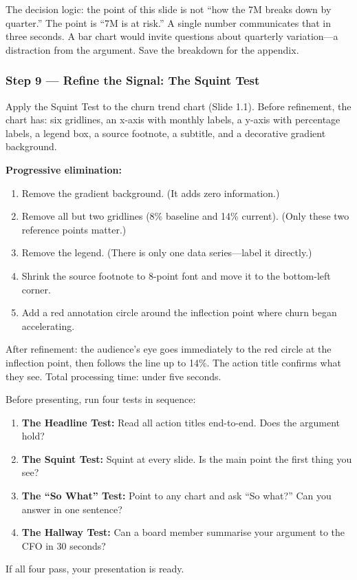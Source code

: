 \noindent The decision logic: the point of this slide is not ``how the \texteuro{}7M breaks down by quarter.'' The point is ``\texteuro{}7M is at risk.'' A single number communicates that in three seconds. A bar chart would invite questions about quarterly variation---a distraction from the argument. Save the breakdown for the appendix.

\subsubsection*{Step 9 --- Refine the Signal: The Squint Test}

Apply the Squint Test to the churn trend chart (Slide 1.1). Before refinement, the chart has: six gridlines, an x-axis with monthly labels, a y-axis with percentage labels, a legend box, a source footnote, a subtitle, and a decorative gradient background.

\noindent\textbf{Progressive elimination:}
\begin{enumerate}
  \item Remove the gradient background. (It adds zero information.)
  \item Remove all but two gridlines (8\% baseline and 14\% current). (Only these two reference points matter.)
  \item Remove the legend. (There is only one data series---label it directly.)
  \item Shrink the source footnote to 8-point font and move it to the bottom-left corner.
  \item Add a red annotation circle around the inflection point where churn began accelerating.
\end{enumerate}

\noindent After refinement: the audience's eye goes immediately to the red circle at the inflection point, then follows the line up to 14\%. The action title confirms what they see. Total processing time: under five seconds.

\begin{alertbox}
Before presenting, run four tests in sequence:
\begin{enumerate}
  \item \textbf{The Headline Test:} Read all action titles end-to-end. Does the argument hold?
  \item \textbf{The Squint Test:} Squint at every slide. Is the main point the first thing you see?
  \item \textbf{The ``So What'' Test:} Point to any chart and ask ``So what?'' Can you answer in one sentence?
  \item \textbf{The Hallway Test:} Can a board member summarise your argument to the CFO in 30 seconds?
\end{enumerate}
If all four pass, your presentation is ready.
\end{alertbox}

